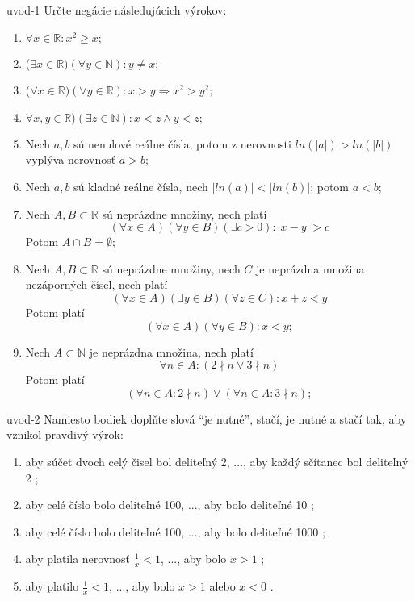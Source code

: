 \begin{defproblem}{uvod-1}
  Určte negácie následujúcich výrokov:
  \begin{enumerate}
    \item $\forall x \in \mathbb{R} : x^2 \geq x;$
    \item ($\exists x \in \mathbb{R})(\forall y \in \mathbb{N}): y \neq x;$
    \item ($\forall x \in \mathbb{R})(\forall y \in \mathbb{R}): 
          x > y \Rightarrow x^2 > y^2;$
    \item $\forall x, y \in \mathbb{R})(\exists z \in \mathbb{N}): x < z \land
          y < z;$
    \item Nech $a, b$ sú nenulové reálne čísla, potom z nerovnosti $ln(|a|)
          > ln(|b|)$ vyplýva nerovnosť $a > b$;
    \item Nech $a, b$ sú kladné reálne čísla, nech $|ln(a)| < |ln(b)|$; potom
          $a < b$;
    \item Nech $A, B \subset \mathbb{R}$ sú neprázdne množiny, nech platí
          $$(\forall x \in A)(\forall y \in B)(\exists c > 0): |x - y| > c$$
          Potom $A \cap B = \emptyset$;
    \item Nech $A, B \subset \mathbb{R}$ sú neprázdne množiny, nech $C$ je
          neprázdna množina nezáporných čísel, nech platí
          $$(\forall x \in A)(\exists y \in B)(\forall z \in C): x + z < y$$
          Potom platí
          $$(\forall x \in A)(\forall y \in B): x < y;$$
    \item Nech $A \subset \mathbb{N}$ je neprázdna množina, nech platí
          $$\forall n \in A: (2 \nmid n \lor 3 \nmid n)$$
          Potom platí
          $$(\forall n \in A: 2 \nmid n) \lor (\forall n \in A: 3 \nmid n);$$
  \end{enumerate}
\end{defproblem}

\begin{defproblem}{uvod-2}
Namiesto bodiek doplňte slová ``je nutné'', stačí, je nutné a stačí tak,
aby vznikol pravdivý výrok:
	
	\begin{enumerate}
		\item aby súčet dvoch celý čisel bol deliteľný 2, ..., aby každý sčítanec bol deliteľný 2 ;
		\item aby celé číslo bolo deliteľné 100, ..., aby bolo deliteľné 10 ;
		\item aby celé číslo bolo deliteľné 100, ..., aby bolo deliteľné 1000 ;
		\item aby platila nerovnosť $\frac{1}{x} < 1$, ..., aby bolo $x > 1$ ;
		\item aby platilo $\frac{1}{x} < 1$, ..., aby bolo $x > 1$ alebo $x < 0$ .
	\end{enumerate}
\end{defproblem}
